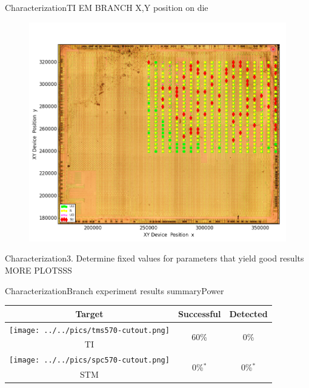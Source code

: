 \documentclass[table]{beamer}
\begin{document}
\begin{frame}{Characterization}{TI EM BRANCH X,Y position on die}
    \vspace{-.3cm}
    \begin{figure}[H]
      \centering
      \includegraphics[width=.75\textwidth]{../../plots/newplots/ti-auth-x-y-ondie.png}
    \end{figure}
\end{frame}

\begin{frame}{Characterization}{3. Determine fixed values for parameters that yield good results}
    \vspace{-.3cm}
    MORE  PLOTSSS
\ \\
\end{frame}


\begin{frame}{Characterization}{Branch experiment results summary}{Power}
    \begin{table}[H]
          \centering
          \begin{tabular}{c c c}
          \toprule
            \cellcolor{white!100} Target & Successful & Detected \\
            \midrule
            \texttt{[image: ../../pics/tms570-cutout.png]} & \multirow{ 2}{*}{60\%} & \multirow{ 2}{*}{0\%} \\ TI & &\\
            \cmidrule{1-3}
            \texttt{[image: ../../pics/spc570-cutout.png]} & \multirow{ 2}{*}{0\%$^*$} & \multirow{ 2}{*}{0\%$^*$} \\ STM& &\\
          \bottomrule
          \end{tabular}
    \end{table}
\end{frame}
\end{document}
